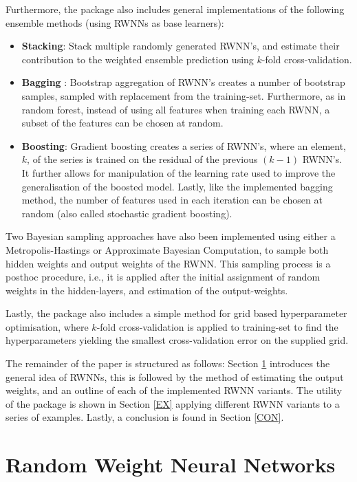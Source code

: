 \documentclass[
]{jss}
\providecommand{\tightlist}{%
  \setlength{\itemsep}{0pt}\setlength{\parskip}{0pt}}
\begin{document}
Furthermore, the  package also includes general
implementations of the following ensemble methods (using RWNNs as base
learners):

\begin{itemize}
\tightlist
\item
  \textbf{Stacking}: Stack multiple randomly generated RWNN's, and
  estimate their contribution to the weighted ensemble prediction using
  \(k\)-fold cross-validation.
\item
  \textbf{Bagging} \citep{Xin2021}: Bootstrap aggregation of RWNN's
  creates a number of bootstrap samples, sampled with replacement from
  the training-set. Furthermore, as in random forest, instead of using
  all features when training each RWNN, a subset of the features can be
  chosen at random.
\item
  \textbf{Boosting}: Gradient boosting creates a series of RWNN's, where
  an element, \(k\), of the series is trained on the residual of the
  previous \((k - 1)\) RWNN's. It further allows for manipulation of the
  learning rate used to improve the generalisation of the boosted model.
  Lastly, like the implemented bagging method, the number of features
  used in each iteration can be chosen at random (also called stochastic
  gradient boosting).
\end{itemize}

Two Bayesian sampling approaches have also been implemented using either
a Metropolis-Hastings or Approximate Bayesian Computation, to sample
both hidden weights and output weights of the RWNN. This sampling
process is a posthoc procedure, i.e., it is applied after the initial
assignment of random weights in the hidden-layers, and estimation of the
output-weights.

Lastly, the  package also includes a simple method for grid
based hyperparameter optimisation, where \(k\)-fold cross-validation is
applied to training-set to find the hyperparameters yielding the
smallest cross-validation error on the supplied grid.

The remainder of the paper is structured as follows: Section \ref{RWNN}
introduces the general idea of RWNNs, this is followed by the method of
estimating the output weights, and an outline of each of the implemented
RWNN variants. The utility of the  package is shown in Section
\ref{EX} applying different RWNN variants to a series of examples.
Lastly, a conclusion is found in Section \ref{CON}.

\hypertarget{RWNN}{%
\section{Random Weight Neural Networks}\label{RWNN}}
\end{document}
